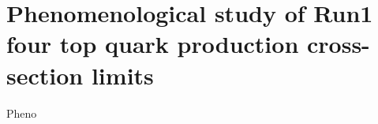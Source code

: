 \chapter{Phenomenological study of Run1 four top quark production cross-section limits}
\label{c:pheno}
Pheno